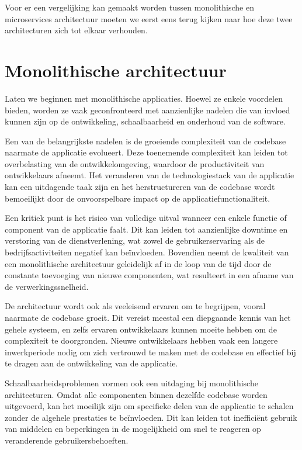 Voor er een vergelijking kan gemaakt worden tussen monolithische en microservices architectuur moeten we eerst eens terug kijken naar hoe deze twee architecturen zich tot elkaar verhouden.


\section{Monolithische architectuur}
Laten we beginnen met monolithische applicaties. Hoewel ze enkele voordelen bieden, worden ze vaak geconfronteerd met aanzienlijke nadelen die van invloed kunnen zijn op de ontwikkeling, schaalbaarheid en onderhoud van de software.


Een van de belangrijkste nadelen is de groeiende complexiteit van de codebase naarmate de applicatie evolueert. Deze toenemende complexiteit kan leiden tot overbelasting van de ontwikkelomgeving, waardoor de productiviteit van ontwikkelaars afneemt. Het veranderen van de technologiestack van de applicatie kan een uitdagende taak zijn en het herstructureren van de codebase wordt bemoeilijkt door de onvoorspelbare impact op de applicatiefunctionaliteit.


Een kritiek punt is het risico van volledige uitval wanneer een enkele functie of component van de applicatie faalt. Dit kan leiden tot aanzienlijke downtime en verstoring van de dienstverlening, wat zowel de gebruikerservaring als de bedrijfsactiviteiten negatief kan beïnvloeden. Bovendien neemt de kwaliteit van een monolithische architectuur geleidelijk af in de loop van de tijd door de constante toevoeging van nieuwe componenten, wat resulteert in een afname van de verwerkingssnelheid.


De architectuur wordt ook als veeleisend ervaren om te begrijpen, vooral naarmate de codebase groeit. Dit vereist meestal een diepgaande kennis van het gehele systeem, en zelfs ervaren ontwikkelaars kunnen moeite hebben om de complexiteit te doorgronden. Nieuwe ontwikkelaars hebben vaak een langere inwerkperiode nodig om zich vertrouwd te maken met de codebase en effectief bij te dragen aan de ontwikkeling van de applicatie.


Schaalbaarheidsproblemen vormen ook een uitdaging bij monolithische architecturen. Omdat alle componenten binnen dezelfde codebase worden uitgevoerd, kan het moeilijk zijn om specifieke delen van de applicatie te schalen zonder de algehele prestaties te beïnvloeden. Dit kan leiden tot inefficiënt gebruik van middelen en beperkingen in de mogelijkheid om snel te reageren op veranderende gebruikersbehoeften.


